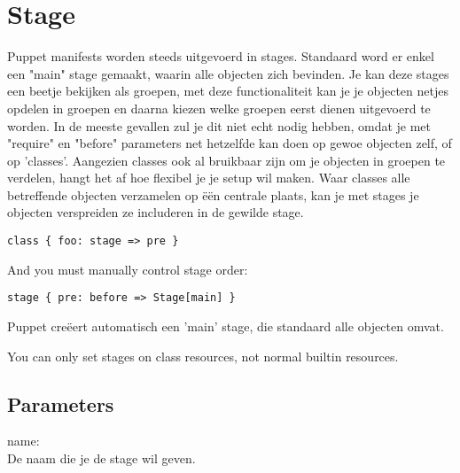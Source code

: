 \section{Stage}
Puppet manifests worden steeds uitgevoerd in stages. Standaard word er enkel een "main" stage gemaakt, waarin alle objecten zich bevinden. Je kan deze stages een beetje bekijken als groepen, met deze functionaliteit kan je je objecten netjes opdelen in groepen en daarna kiezen welke groepen eerst dienen uitgevoerd te worden. In de meeste gevallen zul je dit niet echt nodig hebben, omdat je met "require" en "before" parameters net hetzelfde kan doen op gewoe objecten zelf, of op 'classes'. Aangezien classes ook al bruikbaar zijn om je objecten in groepen te verdelen, hangt het af hoe flexibel je je setup wil maken. Waar classes alle betreffende objecten verzamelen op \"e\"en centrale plaats, kan je met stages je objecten verspreiden ze includeren in de gewilde stage.
%
\begin{code}
\begin{lstlisting}
class { foo: stage => pre }
\end{lstlisting}
\end{code}

And you must manually control stage order:
%
\begin{code}
\begin{lstlisting}
stage { pre: before => Stage[main] }
\end{lstlisting}
\end{code}

Puppet cre\"eert automatisch een 'main' stage, die standaard alle objecten omvat.

You can only set stages on class resources, not normal builtin resources.

\subsection{Parameters}
name:\\
De naam die je de stage wil geven.
